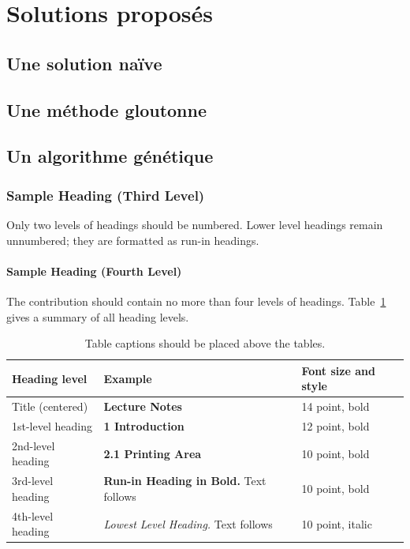 \documentclass[runningheads]{llncs}
\begin{document}
\section{Solutions propos\'es }
\subsection{Une solution na\"ive }
\subsection{Une m\'ethode gloutonne}

\subsection{Un algorithme g\'en\'etique}


\subsubsection{Sample Heading (Third Level)} Only two levels of
headings should be numbered. Lower level headings remain unnumbered;
they are formatted as run-in headings.

\paragraph{Sample Heading (Fourth Level)}
The contribution should contain no more than four levels of
headings. Table~\ref{tab1} gives a summary of all heading levels.

\begin{table}
\caption{Table captions should be placed above the
tables.}\label{tab1}
\begin{tabular}{|l|l|l|}
\hline
Heading level &  Example & Font size and style\\
\hline
Title (centered) &  {\Large\bfseries Lecture Notes} & 14 point, bold\\
1st-level heading &  {\large\bfseries 1 Introduction} & 12 point, bold\\
2nd-level heading & {\bfseries 2.1 Printing Area} & 10 point, bold\\
3rd-level heading & {\bfseries Run-in Heading in Bold.} Text follows & 10 point, bold\\
4th-level heading & {\itshape Lowest Level Heading.} Text follows & 10 point, italic\\
\hline
\end{tabular}
\end{table}
\end{document}
